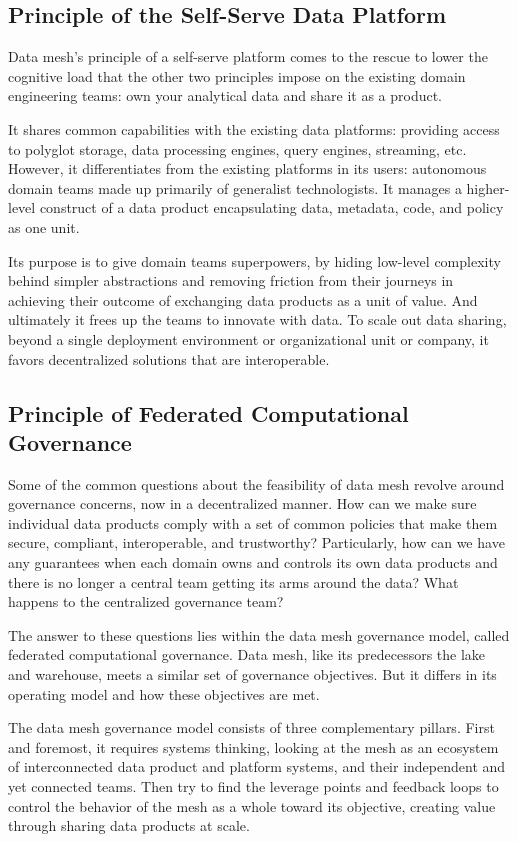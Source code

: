\documentclass[12pt, a4paper]{book}
\begin{document}
\subsection{Principle of the Self-Serve Data Platform}
Data mesh’s principle of a self-serve platform comes to the rescue to lower the cognitive load that the other two principles impose on the existing domain engineering teams: own your analytical data and share it as a product.

It shares common capabilities with the existing data platforms: providing access to polyglot storage, data processing engines, query engines, streaming, etc. However, it differentiates from the existing platforms in its users: autonomous domain teams made up primarily of generalist technologists. It manages a higher-level construct of a data product encapsulating data, metadata, code, and policy as one unit.

Its purpose is to give domain teams superpowers, by hiding low-level complexity behind simpler abstractions and removing friction from their journeys in achieving their outcome of exchanging data products as a unit of value. And ultimately it frees up the teams to innovate with data. To scale out data sharing, beyond a single deployment environment or organizational unit or company, it favors decentralized solutions that are interoperable.

\subsection{Principle of Federated Computational Governance}
Some of the common questions about the feasibility of data mesh revolve around governance concerns, now in a decentralized manner. How can we make sure individual data products comply with a set of common policies that make them secure, compliant, interoperable, and trustworthy? Particularly, how can we have any guarantees when each domain owns and controls its own data products and there is no longer a central team getting its arms around the data? What happens to the centralized governance team?

The answer to these questions lies within the data mesh governance model, called federated computational governance. Data mesh, like its predecessors the lake and warehouse, meets a similar set of governance objectives. But it differs in its operating model and how these objectives are met.

The data mesh governance model consists of three complementary pillars. First and foremost, it requires systems thinking, looking at the mesh as an ecosystem of interconnected data product and platform systems, and their independent and yet connected teams. Then try to find the leverage points and feedback loops to control the behavior of the mesh as a whole toward its objective, creating value through sharing data products at scale.
\end{document}

